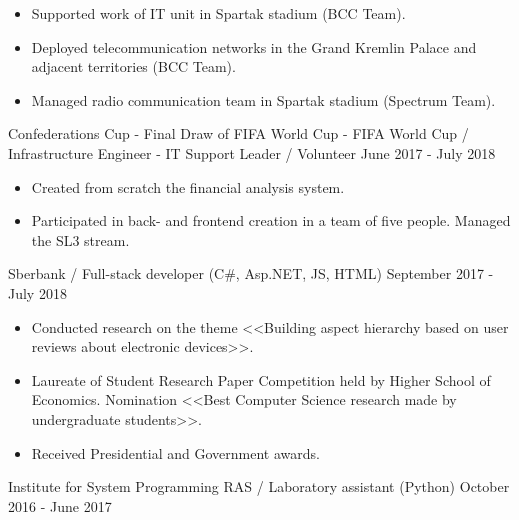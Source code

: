 \begin{cventries}
\vspace{-0.4cm}
\cventry
{
\vspace{-0.4cm}
\begin{itemize}
\item Supported work of IT unit in Spartak stadium (BCC Team).
\item Deployed telecommunication networks in the Grand Kremlin Palace and adjacent territories (BCC Team).
\item Managed radio communication team in Spartak stadium (Spectrum Team).
\end{itemize}
} %
{Confederations Cup - Final Draw of FIFA World Cup - FIFA World Cup / Infrastructure Engineer  - IT Support Leader /  Volunteer} %
{} %
{June 2017 - July 2018} %
\noindent	

\vspace{-0.4cm}
\cventry
{
\vspace{-0.4cm}
\begin{itemize}
\item Created from scratch the financial analysis system.
\item Participated in back- and frontend creation in a team of five people. Managed the SL3 stream.
\end{itemize}
} %
{Sberbank / Full-stack developer (C\#, Asp.NET, JS, HTML)} %
{} %
{September 2017 - July 2018} %
\noindent	


\vspace{-0.4cm}
\cventry
{
\vspace{-0.4cm}
\begin{itemize}
\item Conducted research on the theme <<Building aspect hierarchy based on user reviews about electronic devices>>.
\item Laureate of Student Research Paper Competition held by Higher School of Economics. Nomination <<Best Computer Science research made by undergraduate students>>.
\item Received Presidential and Government awards.
\end{itemize}
} %
{Institute for System Programming RAS / Laboratory assistant (Python)} %
{} %
{October 2016 - June 2017} %
\noindent	



\end{cventries}